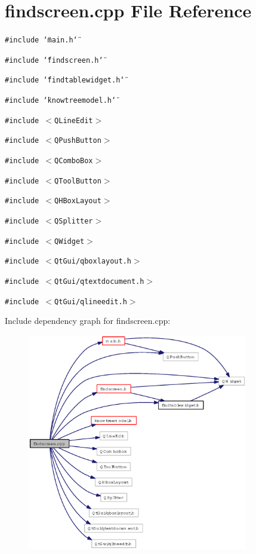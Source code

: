 \section{findscreen.cpp File Reference}
\label{findscreen_8cpp}
{\tt \#include \char`\"{}main.h\char`\"{}}\par
{\tt \#include \char`\"{}findscreen.h\char`\"{}}\par
{\tt \#include \char`\"{}findtablewidget.h\char`\"{}}\par
{\tt \#include \char`\"{}knowtreemodel.h\char`\"{}}\par
{\tt \#include $<$QLine\-Edit$>$}\par
{\tt \#include $<$QPush\-Button$>$}\par
{\tt \#include $<$QCombo\-Box$>$}\par
{\tt \#include $<$QTool\-Button$>$}\par
{\tt \#include $<$QHBox\-Layout$>$}\par
{\tt \#include $<$QSplitter$>$}\par
{\tt \#include $<$QWidget$>$}\par
{\tt \#include $<$Qt\-Gui/qboxlayout.h$>$}\par
{\tt \#include $<$Qt\-Gui/qtextdocument.h$>$}\par
{\tt \#include $<$Qt\-Gui/qlineedit.h$>$}\par


Include dependency graph for findscreen.cpp:\begin{figure}[H]
\begin{center}
\leavevmode
\includegraphics[width=273pt]{findscreen_8cpp__incl}
\end{center}
\end{figure}
